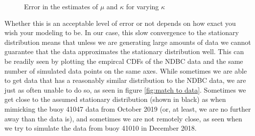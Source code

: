 \documentclass[12pt]{article}
\numberwithin{equation}{section}
\numberwithin{figure}{section}
\begin{document}
\begin{figure}[h]
\centering
{}
\caption{Error in the estimates of $\mu$ and $\kappa$ for varying $\kappa$}\label{fig:convergence}
\end{figure}

Whether this is an acceptable level of error or not depends on how exact you wish your modeling to be. In our case, this slow convergence to the stationary distribution means that unless we are generating large amounts of data we cannot guarantee that the data approximates the stationary distribution well. This can be readily seen by plotting the empircal CDFs of the NDBC data and the same number of simulated data points on the same axes. While sometimes we are able to get data that has a reasonably similar distribution to the NDBC data, we are just as often unable to do so, as seen in figure \ref{fig:match to data}. Sometimes we get close to the assumed stationary distribution (shown in black) as when mimicking the buoy 41047 data from October 2019 (or, at least, we are no further away than the data is), and sometimes we are not remotely close, as seen when we try to simulate the data from buoy 41010 in December 2018. 
\end{document}
